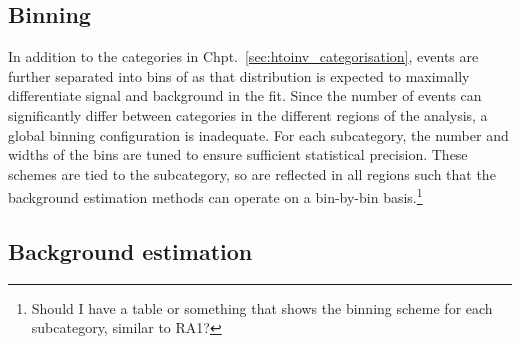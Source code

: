 






\subsection{Binning}
\label{subsec:htoinv_binning}

In addition to the categories in Chpt.~\ref{sec:htoinv_categorisation}, events are further separated into bins of \ptmiss as that distribution is expected to maximally differentiate signal and background in the fit. Since the number of events can significantly differ between categories in the different regions of the analysis, a global binning configuration is inadequate. For each subcategory, the number and widths of the bins are tuned to ensure sufficient statistical precision. These schemes are tied to the subcategory, so are reflected in all regions such that the background estimation methods can operate on a bin-by-bin basis.\footnote{Should I have a table or something that shows the binning scheme for each subcategory, similar to RA1?}




\subsection{Background estimation}
\label{subsec:htoinv_background_est}

